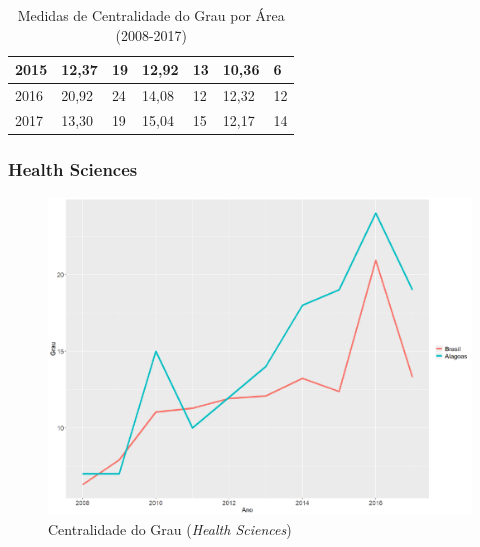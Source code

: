 \begin{table}[H]
\begin{tabular}{|l|l|l|l|l|l|l|}
		2015          & 12,37                                                  & 19                                                      & 12,92                                                     & 13                                                         & 10,36                                                       & 6                                                           \\ \hline
		2016          & 20,92                                                  & 24                                                      & 14,08                                                     & 12                                                         & 12,32                                                       & 12                                                          \\ \hline
		2017          & 13,30                                                  & 19                                                      & 15,04                                                     & 15                                                         & 12,17                                                       & 14                                                          \\ \hline
	\end{tabular}
	\caption{Medidas de Centralidade do Grau por Área (2008-2017)}
	\label{degree-tab}
\end{table}

\subsubsection{Health Sciences}

\begin{figure}[H]
\centering
\includegraphics[scale=0.4]{Imagens/graf-linha-degree-br-al.pdf}
\caption{Centralidade do Grau (\textit{Health Sciences})}
\label{degree-health-1}
\end{figure}

